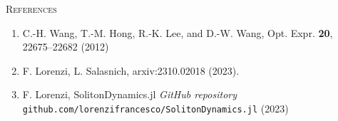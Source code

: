\documentclass[final]{beamer}
\newlength{\sepwidth}
\newlength{\colwidth}
\newcommand{\separatorcolumn}{\begin{column}{\sepwidth}\end{column}}
\begin{document}
\begin{frame}[t]
\begin{columns}[t]
\begin{column}{\colwidth}
\begin{block}{\textsc{References}}
\begin{enumerate}
            \item C.-H. Wang, T.-M. Hong, R.-K. Lee, and D.-W. Wang, Opt. Expr. \textbf{20}, 22675–22682 (2012)
            \item F. Lorenzi, L. Salasnich, arxiv:2310.02018 (2023).
            \item F. Lorenzi, SolitonDynamics.jl \textit{GitHub repository} \texttt{github.com/lorenzifrancesco/SolitonDynamics.jl} (2023)
        \end{enumerate}
      \end{block}

    \end{column}
    \separatorcolumn
  \end{columns}
\end{frame}
\end{document}
